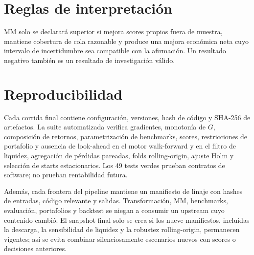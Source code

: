 \documentclass[11pt,letterpaper]{article}
\begin{document}
\section{Reglas de interpretación}

MM solo se declarará superior si mejora scores propios fuera de muestra, mantiene
cobertura de cola razonable y produce una mejora económica neta cuyo intervalo de
incertidumbre sea compatible con la afirmación. Un resultado negativo también es un
resultado de investigación válido.

\section{Reproducibilidad}

Cada corrida final contiene configuración, versiones, hash de código y SHA-256 de
artefactos. La suite automatizada verifica gradientes, monotonía de $G$, composición
de retornos, parametrización de benchmarks, scores, restricciones de portafolio y
ausencia de look-ahead en el motor walk-forward y en el filtro de liquidez, agregación
de pérdidas pareadas, folds rolling-origin, ajuste Holm y selección de starts
estacionarios. Los 49 tests verdes prueban contratos de software; no prueban
rentabilidad futura.

Además, cada frontera del pipeline mantiene un manifiesto de linaje con hashes de
entradas, código relevante y salidas. Transformación, MM, benchmarks, evaluación,
portafolios y backtest se niegan a consumir un upstream cuyo contenido cambió. El
snapshot final solo se crea si los nueve manifiestos, incluidas la descarga, la
sensibilidad de liquidez y la robustez rolling-origin, permanecen vigentes; así se evita
combinar silenciosamente escenarios nuevos con scores o decisiones anteriores.
\end{document}
